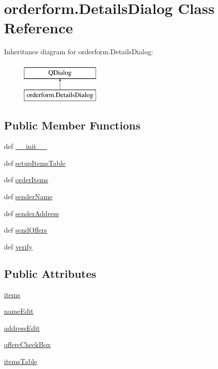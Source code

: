 \hypertarget{classorderform_1_1DetailsDialog}{}\section{orderform.\+Details\+Dialog Class Reference}
\label{classorderform_1_1DetailsDialog}
Inheritance diagram for orderform.\+Details\+Dialog\+:\begin{figure}[H]
\begin{center}
\leavevmode
\includegraphics[height=2.000000cm]{classorderform_1_1DetailsDialog}
\end{center}
\end{figure}
\subsection*{Public Member Functions}
\begin{DoxyCompactItemize}
\item 
def \hyperlink{classorderform_1_1DetailsDialog_a1cf38bd2cad304f7fe7381dff32d324c}{\+\_\+\+\_\+init\+\_\+\+\_\+}
\item 
def \hyperlink{classorderform_1_1DetailsDialog_a290a1fbc9f73946b3ffcc7007c7bbe38}{setup\+Items\+Table}
\item 
def \hyperlink{classorderform_1_1DetailsDialog_af965937d68005076e72a92343329998e}{order\+Items}
\item 
def \hyperlink{classorderform_1_1DetailsDialog_a83fa2508f3d74477bc183858e927d6a8}{sender\+Name}
\item 
def \hyperlink{classorderform_1_1DetailsDialog_af6403419daf83a3fadc0fc2c137812e6}{sender\+Address}
\item 
def \hyperlink{classorderform_1_1DetailsDialog_a4b33d3e1191c6cd9c9b37555ba55d032}{send\+Offers}
\item 
def \hyperlink{classorderform_1_1DetailsDialog_a36d078243b994b22e030650468f86a13}{verify}
\end{DoxyCompactItemize}
\subsection*{Public Attributes}
\begin{DoxyCompactItemize}
\item 
\hyperlink{classorderform_1_1DetailsDialog_a79844b0c4dd60b2970c11c19187300a5}{items}
\item 
\hyperlink{classorderform_1_1DetailsDialog_a9b6181cd105b63af77318a20e6279585}{name\+Edit}
\item 
\hyperlink{classorderform_1_1DetailsDialog_a966618e524d88322d22c9af6d8317a1f}{address\+Edit}
\item 
\hyperlink{classorderform_1_1DetailsDialog_aed67ed52f3566f6f3c232a9a72b39811}{offers\+Check\+Box}
\item 
\hyperlink{classorderform_1_1DetailsDialog_ac4caaa2b5cb39808d8a9a87bbc0eb4f6}{items\+Table}
\end{DoxyCompactItemize}


